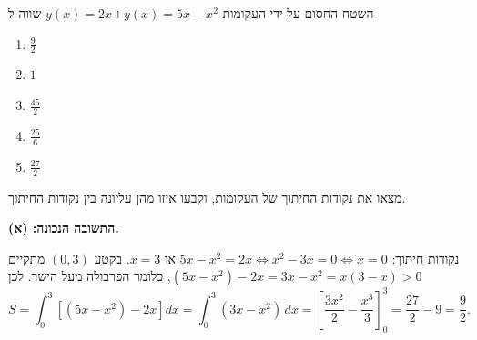 
\begin{question}
השטח החסום על ידי העקומות $y(x)=5x-x^2$ ו-$y(x)=2x$ שווה ל-
\begin{enumerate}
  \item[(א)] $\frac92$
  \item[(ב)] $1$
  \item[(ג)] $\frac{45}{2}$
  \item[(ד)] $\frac{25}{6}$
  \item[(ה)] $\frac{27}{2}$
\end{enumerate}
\end{question}

\begin{hint}
מצאו את נקודות החיתוך של העקומות, וקבעו איזו מהן עליונה בין נקודות החיתוך.
\end{hint}

\begin{solution}
\textbf{התשובה הנכונה: (א).}

נקודות חיתוך: $5x-x^2=2x\iff x^2-3x=0\iff x=0$ או $x=3$.
בקטע $(0,3)$ מתקיים $(5x-x^2)-2x = 3x-x^2 = x(3-x)>0$, כלומר הפרבולה מעל הישר. לכן
\[ S=\int_0^3\left[(5x-x^2)-2x\right]dx = \int_0^3(3x-x^2)\,dx = \left[\frac{3x^2}{2}-\frac{x^3}{3}\right]_0^3 = \frac{27}{2}-9 = \frac92. \]
\end{solution}
